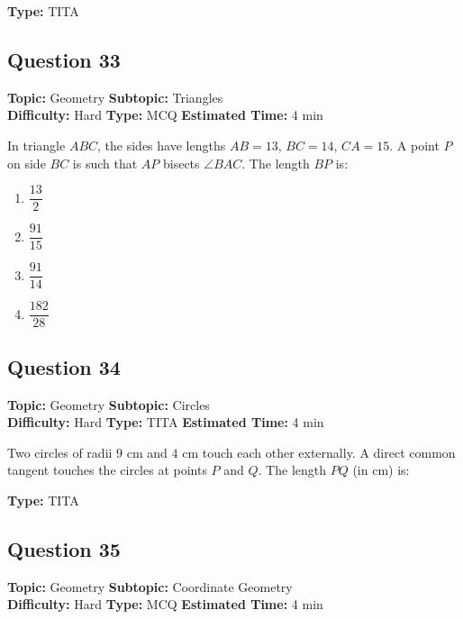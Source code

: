 \documentclass[11pt]{article}
\begin{document}
\textbf{Type:} TITA

\subsection*{Question 33}
\textbf{Topic:} Geometry \quad \textbf{Subtopic:} Triangles \\
\textbf{Difficulty:} Hard \quad \textbf{Type:} MCQ \quad \textbf{Estimated Time:} 4 min

\begin{tcolorbox}
In triangle \(ABC\), the sides have lengths \(AB = 13\), \(BC = 14\), \(CA = 15\). A point \(P\) on side \(BC\) is such that \(AP\) bisects \(\angle BAC\). The length \(BP\) is:
\end{tcolorbox}

\begin{enumerate}[label=(\Alph*)]
    \item \(\dfrac{13}{2}\)
    \item \(\dfrac{91}{15}\)
    \item \(\dfrac{91}{14}\)
    \item \(\dfrac{182}{28}\)
\end{enumerate}

\subsection*{Question 34}
\textbf{Topic:} Geometry \quad \textbf{Subtopic:} Circles \\
\textbf{Difficulty:} Hard \quad \textbf{Type:} TITA \quad \textbf{Estimated Time:} 4 min

\begin{tcolorbox}
Two circles of radii \(9\) cm and \(4\) cm touch each other externally. A direct common tangent touches the circles at points \(P\) and \(Q\). The length \(PQ\) (in cm) is:
\end{tcolorbox}

\textbf{Type:} TITA

\subsection*{Question 35}
\textbf{Topic:} Geometry \quad \textbf{Subtopic:} Coordinate Geometry \\
\textbf{Difficulty:} Hard \quad \textbf{Type:} MCQ \quad \textbf{Estimated Time:} 4 min
\end{document}
